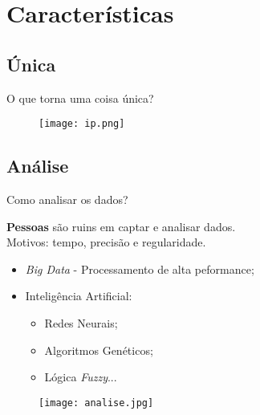 \section{Características}
\label{sec:caracteristicas}

\subsection*{Única}
\begin{frame}{O que torna uma coisa única?}
	
	\begin{figure}[H]
		\texttt{[image: ip.png]}\footnotemark
	\end{figure}
	
\end{frame}

\subsection*{Análise}
\begin{frame}{Como analisar os dados?}
	\begin{block}{}
		\textbf{Pessoas} são ruins em captar e analisar dados. \\Motivos: tempo, precisão e regularidade.
	\end{block}
	
	\begin{itemize}
		\item \textit{Big Data} - Processamento de alta peformance;
		\item Inteligência Artificial: 
		\begin{itemize}
			\item Redes Neurais; 
			\item Algoritmos Genéticos;
			\item Lógica \textit{Fuzzy}...
		\end{itemize}
	\end{itemize}
	
	\begin{figure}[H]
		\texttt{[image: analise.jpg]}\footnotemark
	\end{figure}
	
\end{frame}


